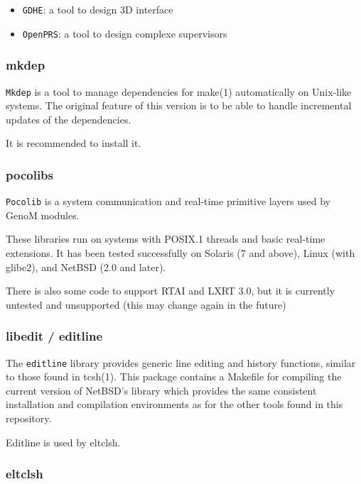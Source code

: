 \begin{itemize}
\item {\tt GDHE}: a tool to design 3D interface
\item {\tt OpenPRS}: a tool to design complexe supervisors
\end{itemize}

\subsubsection{mkdep}

{\tt Mkdep} is a tool to manage dependencies for make(1) automatically on
Unix-like systems.  The original feature of this version is to be able to
handle incremental updates of the dependencies.

It is recommended to install it.

\subsubsection{pocolibs}

{\tt Pocolib} is a system communication and real-time primitive layers used by
GenoM modules. 

These libraries run on systems with POSIX.1 threads and basic real-time
extensions. It has been tested successfully on Solaris (7 and above),
Linux (with glibc2), and NetBSD (2.0 and later). 

There is also some code to support RTAI and LXRT 3.0, but it is currently
untested and unsupported (this may change again in the future) 

\subsubsection{libedit / editline}

The {\tt editline} library provides generic line editing and history
functions, similar to those found in tcsh(1). This package contains a
Makefile for compiling the current version of NetBSD's library which
provides the same consistent installation and compilation environments as
for the other tools found in this repository. 

Editline is used by eltclsh.

\subsubsection{eltclsh}


